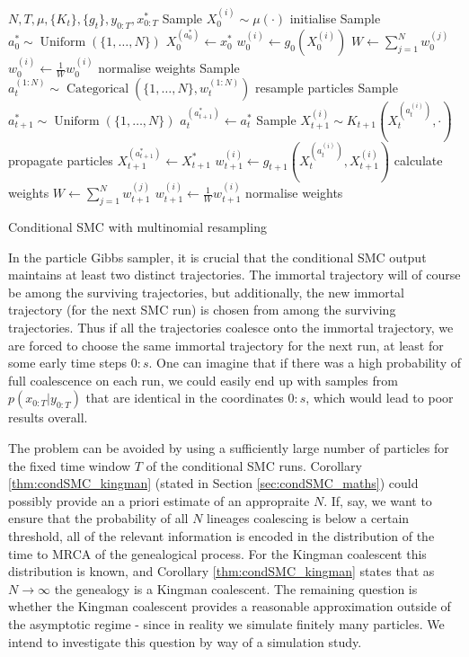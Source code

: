 \documentclass[fleqn]{article}
\theoremstyle{definition}
\newcommand{\Cat}{\operatorname{Categorical}}
\newcommand{\Unif}{\operatorname{Uniform}}
\begin{document}
\begin{algorithm}
\begin{algorithmic}[1]
\Require $N, T, \mu, \{K_t\}, \{g_t\}, y_{0:T}, x_{0:T}^*$
	\State Sample $X_0^{(i)} \sim \mu(\cdot)$ \Comment initialise
\EndFor
\State Sample $a_0^* \sim \Unif(\{1,\dots,N\})$
\State $X_0^{(a_0^*)} \gets x_0^*$
	\State $w_0^{(i)} \gets g_0(X_0^{(i)})$
\EndFor
\State $W \gets \sum_{j=1}^N w_{0}^{(j)}$
		\State $w_{0}^{(i)} \gets \frac{1}{W}w_{0}^{(i)}$ \Comment normalise weights
	\EndFor
{}
	\State Sample $a_t^{(1:N)} \sim \Cat(\{1,\dots,N\}, w_t^{(1:N)})$ \Comment resample particles
	\State Sample $a_{t+1}^* \sim \Unif(\{1,\dots,N\})$
	\State $a_t^{(a_{t+1}^*)} \gets a_t^*$
		\State Sample $X_{t+1}^{(i)} \sim K_{t+1}(X_t^{(a_t^{(i)})}, \cdot)$ \Comment propagate particles
	\EndFor
	\State $X_{t+1}^{(a_{t+1}^*)} \gets X_{t+1}^*$
		\State $w_{t+1}^{(i)} \gets g_{t+1}(X_t^{(a_t^{(i)})} , X_{t+1}^{(i)})$ \Comment calculate weights
	\EndFor
	\State $W \gets \sum_{j=1}^N w_{t+1}^{(j)}$
		\State $w_{t+1}^{(i)} \gets \frac{1}{W}w_{t+1}^{(i)}$ \Comment normalise weights
	\EndFor
\EndFor
\end{algorithmic}
\caption{Conditional SMC with multinomial resampling}
\label{alg:condSMC}
\end{algorithm}

In the particle Gibbs sampler, it is crucial that the conditional SMC output maintains at least two distinct trajectories. 
The immortal trajectory will of course be among the surviving trajectories, but additionally, the new immortal trajectory (for the next SMC run) is chosen from among the surviving trajectories.
Thus if all the trajectories coalesce onto the immortal trajectory, we are forced to choose the same immortal trajectory for the next run, at least for some early time steps $0:s$.
One can imagine that if there was a high probability of full coalescence on each run, we could easily end up with samples from $p(x_{0:T}|y_{0:T})$ that are identical in the coordinates $0:s$, which would lead to poor results overall.

The problem can be avoided by using a sufficiently large number of particles for the fixed time window $T$ of the conditional SMC runs. Corollary \ref{thm:condSMC_kingman} (stated in Section \ref{sec:condSMC_maths}) could possibly provide an a priori estimate of an appropraite $N$.
If, say, we want to ensure that the probability of all $N$ lineages coalescing is below a certain threshold, all of the relevant information is encoded in the distribution of the time to MRCA of the genealogical process. For the Kingman coalescent this distribution is known, and Corollary \ref{thm:condSMC_kingman} states that as $N\to\infty$ the genealogy is a Kingman coalescent.
The remaining question is whether the Kingman coalescent provides a reasonable approximation outside of the asymptotic regime - since in reality we simulate finitely many particles. We intend to investigate this question by way of a simulation study.
\end{document}
